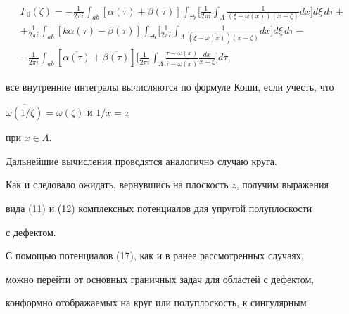 \begin{multline*}


F_0(\zeta) = -\frac{1}{2\pi i} \int_{ab} [\alpha(\tau)+\beta(\tau)]


\int_{\tau b}


\bigg[ \frac{1}{2\pi i}\int_{\Lambda}


\frac{1}{(\xi-\omega(x))(x-\zeta)} dx\bigg] d\xi\, d\tau + \\


%


+ \frac{1}{2\pi i} \int_{ab} [k\alpha(\tau)-\beta(\tau)]


\int_{\tau b}


\bigg[ \frac{1}{2\pi i}\int_{\Lambda}


\frac{1}{(\overline{\xi}-\overline{\omega(x)})(x-\zeta)} dx


\bigg] d\overline{\xi}\, d\tau - \\


%


- \frac{1}{2\pi i} \int_{ab} [\overline{\alpha(\tau)}


+\overline{\beta(\tau)}]


\bigg[ \frac{1}{2\pi i}\int_{\Lambda}


\frac{\tau-\omega(x)}{\overline{\tau}-\overline{\omega(x)}}


\frac{dx}{x-\zeta}


\bigg] d\overline{\tau} ,


\end{multline*}


все внутренние интегралы вычисляются по формуле Коши, если учесть, что


$\overline{\omega(1/\overline{\zeta})}=\omega(\zeta)$ и $1/\overline{x}=x$


при $x\in\Lambda$.


Дальнейшие вычисления проводятся аналогично случаю круга.


Как и следовало ожидать, вернувшись на плоскость $z$, получим выражения


вида (11) и (12) комплексных потенциалов для упругой полуплоскости


с дефектом.





С помощью потенциалов (17), как и в ранее рассмотренных случаях,


можно перейти от основных граничных задач для областей с дефектом,


конформно отображаемых на круг или полуплоскость, к сингулярным


